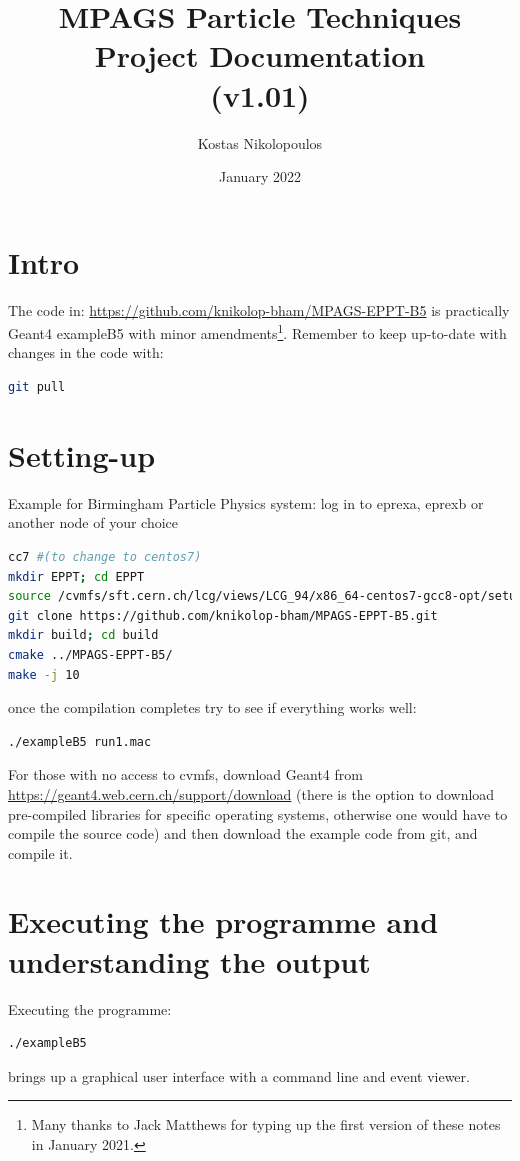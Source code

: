 \documentclass[a4paper,11pt,twoside]{article}
\title{MPAGS Particle Techniques\\ Project Documentation\\ (v1.01)}
\author{Kostas Nikolopoulos}
\date{January 2022}
\begin{document}
\maketitle

\section{Intro}
The code in: \href{https://github.com/knikolop-bham/MPAGS-EPPT-B5}{https://github.com/knikolop-bham/MPAGS-EPPT-B5}
is practically Geant4 exampleB5 with minor amendments\footnote{Many thanks to Jack Matthews for typing up the first version of these notes in January 2021.}.
Remember to keep up-to-date with changes in the code with: 
\begin{lstlisting}[language=bash]
git pull
\end{lstlisting}


\section{Setting-up}
Example for Birmingham Particle Physics system:
log in to eprexa, eprexb or another node of your choice
\begin{lstlisting}[language=sh]
cc7 #(to change to centos7)
mkdir EPPT; cd EPPT
source /cvmfs/sft.cern.ch/lcg/views/LCG_94/x86_64-centos7-gcc8-opt/setup.sh
git clone https://github.com/knikolop-bham/MPAGS-EPPT-B5.git
mkdir build; cd build
cmake ../MPAGS-EPPT-B5/
make -j 10
\end{lstlisting}
once the compilation completes try to see if everything works well: 
\begin{lstlisting}
./exampleB5 run1.mac
\end{lstlisting}
For those with no access to cvmfs, download Geant4 from \href{https://geant4.web.cern.ch/support/download}{https://geant4.web.cern.ch/support/download}
(there is the option to download pre-compiled libraries for specific operating systems, otherwise one would have to compile the source code)
and then download the example code from git, and compile it.



\section{Executing the programme and understanding the output}
Executing the programme: 
\begin{lstlisting}
./exampleB5
\end{lstlisting}
brings up a graphical user interface with a command line and event viewer.
\end{document}
